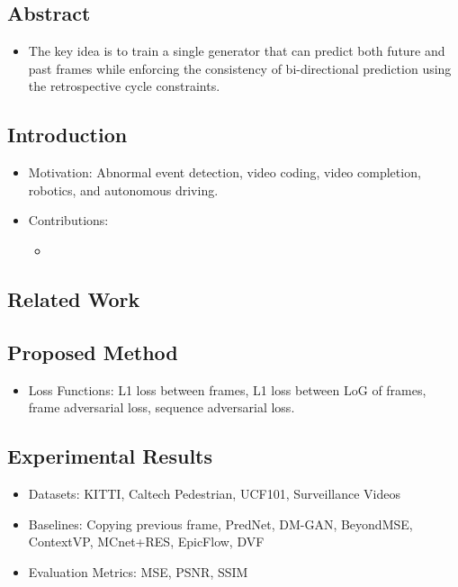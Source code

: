 \documentclass{article}
\begin{document}
    \subsection*{Abstract}
    \begin{itemize}
        \item The key idea is to train a single generator that can predict both future and past frames while enforcing the consistency of bi-directional prediction using the retrospective cycle constraints.
    \end{itemize}

    \subsection{Introduction}\label{subsec:Predicting_Future_Frames_using_Retrospective_Cycle_GAN:introduction}
    \begin{itemize}
        \item Motivation: Abnormal event detection, video coding, video completion, robotics, and autonomous driving.
        \item Contributions:
        \begin{itemize}
            \item
        \end{itemize}
    \end{itemize}

    \subsection{Related Work}\label{subsec:Predicting_Future_Frames_using_Retrospective_Cycle_GAN:related-work}

    \subsection{Proposed Method}\label{subsec:Predicting_Future_Frames_using_Retrospective_Cycle_GAN:proposed-method}
    \begin{itemize}
        \item Loss Functions: L1 loss between frames, L1 loss between LoG of frames, frame adversarial loss, sequence adversarial loss.
    \end{itemize}

    \subsection{Experimental Results}\label{subsec:Predicting_Future_Frames_using_Retrospective_Cycle_GAN:experimental-results}
    \begin{itemize}
        \item Datasets: KITTI, Caltech Pedestrian, UCF101, Surveillance Videos
        \item Baselines: Copying previous frame, PredNet, DM-GAN, BeyondMSE, ContextVP, MCnet+RES, EpicFlow, DVF
        \item Evaluation Metrics: MSE, PSNR, SSIM
    \end{itemize}
\end{document}
